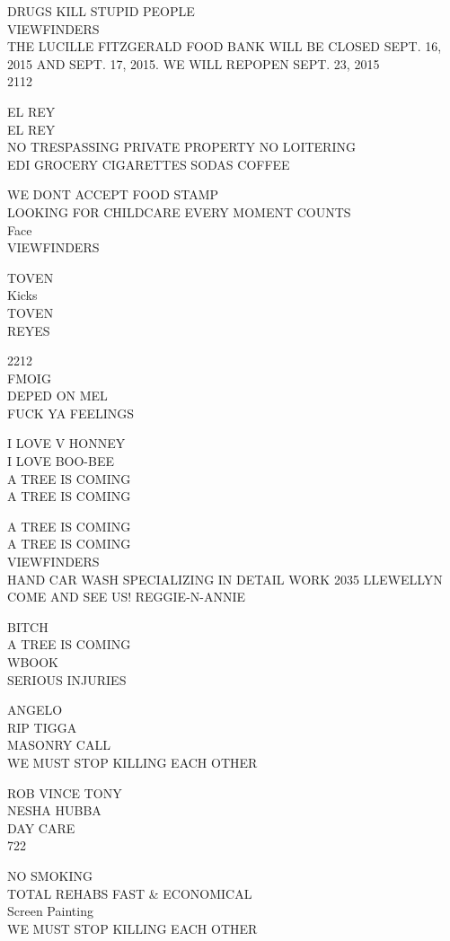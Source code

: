 \documentclass[10pt,letterpaper]{article}
\begin{document}
DRUGS KILL STUPID PEOPLE\\
VIEWFINDERS\\
THE LUCILLE FITZGERALD FOOD BANK WILL BE CLOSED SEPT. 16, 2015 AND SEPT. 17, 2015.  WE WILL REPOPEN SEPT. 23, 2015\\
2112

EL REY\\
EL REY\\
NO TRESPASSING PRIVATE PROPERTY NO LOITERING\\
EDI GROCERY CIGARETTES SODAS COFFEE

WE DONT ACCEPT FOOD STAMP\\
LOOKING FOR CHILDCARE EVERY MOMENT COUNTS\\
Face\\
VIEWFINDERS

TOVEN\\
Kicks\\
TOVEN\\
REYES

2212\\
FMOIG\\
DEPED ON MEL\\
FUCK YA FEELINGS

I LOVE V HONNEY\\
I LOVE BOO{-}BEE\\
A TREE IS COMING\\
A TREE IS COMING

A TREE IS COMING\\
A TREE IS COMING\\
VIEWFINDERS\\
HAND CAR WASH SPECIALIZING IN DETAIL WORK 2035 LLEWELLYN COME AND SEE US!  REGGIE{-}N{-}ANNIE

BITCH\\
A TREE IS COMING\\
WBOOK\\
SERIOUS INJURIES

ANGELO\\
RIP TIGGA\\
MASONRY CALL\\
WE MUST STOP KILLING EACH OTHER

ROB VINCE TONY\\
NESHA HUBBA\\
DAY CARE\\
722

NO SMOKING\\
TOTAL REHABS FAST \& ECONOMICAL\\
Screen Painting\\
WE MUST STOP KILLING EACH OTHER
\end{document}
